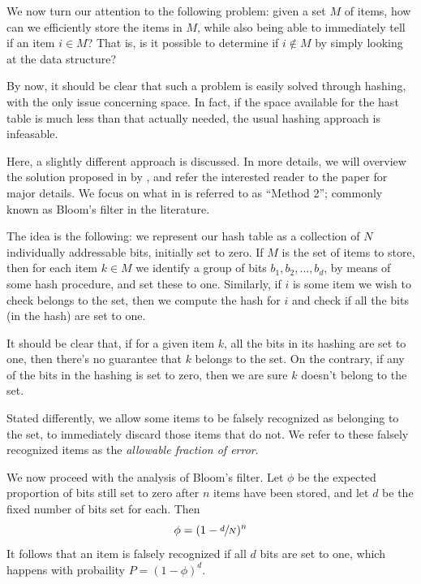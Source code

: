 \documentclass{subfiles}
\begin{document}
    We now turn our attention to the following problem:
        given a set \(M\) of items, how can we efficiently store the items in \(M\),
        while also being able to immediately tell if an item \(i \in M\)?
        That is, is it possible to determine if \(i \notin M\) by simply looking at the data structure?

    By now, it should be clear that such a problem is easily solved through hashing,
        with the only issue concerning space. In fact, if the space available for the hast table
        is much less than that actually needed, the usual hashing approach is infeasable.

    Here, a slightly different approach is discussed. In more details,
        we will overview the solution proposed in \cite{Bloom1970} by \citeauthor{Bloom1970},
        and refer the interested reader to the paper for major details.
        We focus on what in \cite{Bloom1970} is referred to as ``Method 2'';
        commonly known as Bloom's filter in the literature.

    The idea is the following: we represent our hash table as a collection of \(N\) individually
        addressable bits, initially set to zero. If \(M\) is the set of items to store,
        then for each item \(k \in M\) we identify a group of bits \(b_{1}, b_{2}, \ldots, b_{d}\),
        by means of some hash procedure, and set these to one.
        Similarly, if \(i\) is some item we wish to check belongs to the set,
        then we compute the hash for \(i\) and check if all the bits (in the hash) are set to one.

    \begin{remark*}
        It should be clear that, if for a given item \(k\), 
            all the bits in its hashing are set to one, then there's no guarantee that \(k\) belongs to the set.
            On the contrary, if any of the bits in the hashing is set to zero,
            then we are sure \(k\) doesn't belong to the set.

        Stated differently, we allow some items to be falsely recognized as belonging to the set,
            to immediately discard those items that do not.
            We refer to these falsely recognized items as the \emph{allowable fraction of error}.
    \end{remark*}

    We now proceed with the analysis of Bloom's filter.
        Let \(\phi\) be the expected proportion of bits still set to zero after \(n\) items 
        have been stored, and let \(d\) be the fixed number of bits set for each.
        Then 
        \[
            \phi = (1 - \sfrac{d}{N})^{n}
        \]
        It follows that an item is falsely recognized if all \(d\) bits are set to one,
        which happens with probaility \(P = (1 - \phi)^{d}\).
\end{document}

